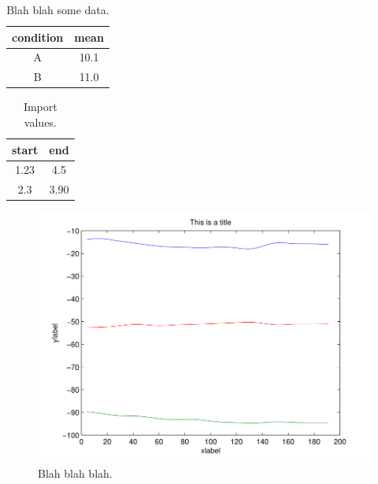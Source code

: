 \documentclass[letterpaper,12pt]{article}
\begin{document}
\newpage
\clearpage
\parbox[c][\textheight][s]{\linewidth}{%
\begin{table}[H]
	\centering
	\begin{tabular}{c|c}
		condition &mean\\
		\hline\hline
		A         &10.1\\
		B         &11.0\\
	\end{tabular}
 \caption{Blah blah some data.}
 \label{tbl:somedata}
\end{table}
}

\newpage
\clearpage
\parbox[c][\textheight][s]{\linewidth}{%
\begin{table}[H]
	\centering
	\begin{tabular}{c|c}
		start &end\\
		\hline\hline
		1.23         &4.5\\
		2.3         &3.90\\
	\end{tabular}
 \caption{Import values.}
 \label{tbl:someOtherData}
\end{table}
}
 

\newpage
\clearpage
\parbox[c][\textheight][s]{\linewidth}{%
\begin{figure}[H]
	\centering
    \includegraphics{./figures/fig1.pdf}
 \caption{Blah blah blah.}
 \label{fig:rawMU}
\end{figure}
}
\end{document}
